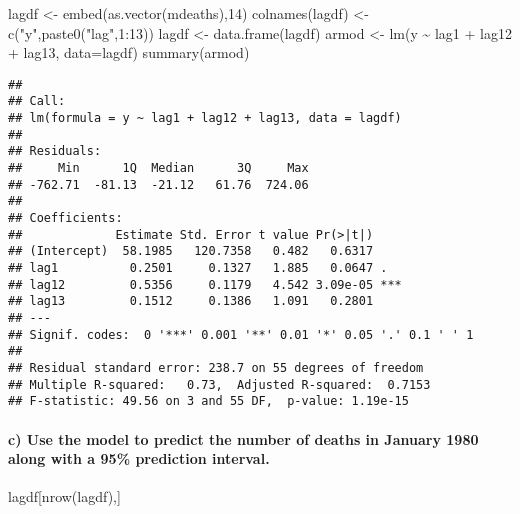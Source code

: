\documentclass[
]{article}
\newenvironment{Shaded}{\begin{snugshade}}{\end{snugshade}}
\newcommand{\AttributeTok}[1]{\textcolor[rgb]{0.77,0.63,0.00}{#1}}
\newcommand{\DecValTok}[1]{\textcolor[rgb]{0.00,0.00,0.81}{#1}}
\newcommand{\FunctionTok}[1]{\textcolor[rgb]{0.00,0.00,0.00}{#1}}
\newcommand{\NormalTok}[1]{#1}
\newcommand{\OtherTok}[1]{\textcolor[rgb]{0.56,0.35,0.01}{#1}}
\newcommand{\SpecialCharTok}[1]{\textcolor[rgb]{0.00,0.00,0.00}{#1}}
\newcommand{\StringTok}[1]{\textcolor[rgb]{0.31,0.60,0.02}{#1}}
\begin{document}
\begin{Shaded}
\begin{Highlighting}[]
\NormalTok{lagdf }\OtherTok{\textless{}{-}} \FunctionTok{embed}\NormalTok{(}\FunctionTok{as.vector}\NormalTok{(mdeaths),}\DecValTok{14}\NormalTok{)}
\FunctionTok{colnames}\NormalTok{(lagdf) }\OtherTok{\textless{}{-}} \FunctionTok{c}\NormalTok{(}\StringTok{"y"}\NormalTok{,}\FunctionTok{paste0}\NormalTok{(}\StringTok{"lag"}\NormalTok{,}\DecValTok{1}\SpecialCharTok{:}\DecValTok{13}\NormalTok{))}
\NormalTok{lagdf }\OtherTok{\textless{}{-}} \FunctionTok{data.frame}\NormalTok{(lagdf)}
\NormalTok{armod }\OtherTok{\textless{}{-}} \FunctionTok{lm}\NormalTok{(y }\SpecialCharTok{\textasciitilde{}}\NormalTok{ lag1 }\SpecialCharTok{+}\NormalTok{ lag12 }\SpecialCharTok{+}\NormalTok{ lag13, }\AttributeTok{data=}\NormalTok{lagdf)}
\FunctionTok{summary}\NormalTok{(armod)}
\end{Highlighting}
\end{Shaded}

\begin{verbatim}
## 
## Call:
## lm(formula = y ~ lag1 + lag12 + lag13, data = lagdf)
## 
## Residuals:
##     Min      1Q  Median      3Q     Max 
## -762.71  -81.13  -21.12   61.76  724.06 
## 
## Coefficients:
##             Estimate Std. Error t value Pr(>|t|)    
## (Intercept)  58.1985   120.7358   0.482   0.6317    
## lag1          0.2501     0.1327   1.885   0.0647 .  
## lag12         0.5356     0.1179   4.542 3.09e-05 ***
## lag13         0.1512     0.1386   1.091   0.2801    
## ---
## Signif. codes:  0 '***' 0.001 '**' 0.01 '*' 0.05 '.' 0.1 ' ' 1
## 
## Residual standard error: 238.7 on 55 degrees of freedom
## Multiple R-squared:   0.73,  Adjusted R-squared:  0.7153 
## F-statistic: 49.56 on 3 and 55 DF,  p-value: 1.19e-15
\end{verbatim}

\hypertarget{c-use-the-model-to-predict-the-number-of-deaths-in-january-1980-along-with-a-95-prediction-interval.}{%
\paragraph{c) Use the model to predict the number of deaths in January
1980 along with a 95\% prediction
interval.}\label{c-use-the-model-to-predict-the-number-of-deaths-in-january-1980-along-with-a-95-prediction-interval.}}

\begin{Shaded}
\begin{Highlighting}[]
\NormalTok{lagdf[}\FunctionTok{nrow}\NormalTok{(lagdf),]}
\end{Highlighting}
\end{Shaded}
\end{document}
